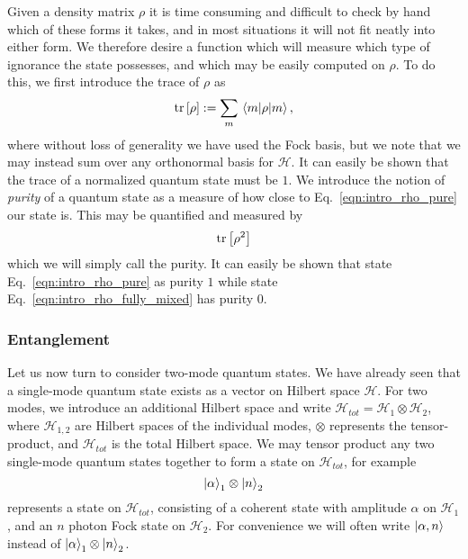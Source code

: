 Given a density matrix $\rho$ it is time consuming and difficult to check by hand which of these forms it takes, and in most situations it will not fit neatly into either form. We therefore desire a function which will measure which type of ignorance the state possesses, and which may be easily computed on $\rho$. To do this, we first introduce the trace of $\rho$ as
\begin{equation}
\tr\left[\rho\right] := \sum_m \mel{m}{\rho}{m},
\end{equation}
where without loss of generality we have used the Fock basis, but we note that we may instead sum over any orthonormal basis for $\mathcal{H}$. It can easily be shown that the trace of a normalized quantum state must be $1$. We introduce the notion of \emph{purity} of a quantum state as a measure of how close to Eq.~\ref{eqn:intro_rho_pure} our state is. This may be quantified and measured by
\begin{equation}\label{eqn:intro_purity}
\tr\left[ \rho^2 \right]
\end{equation}
which we will simply call the purity. It can easily be shown that state Eq.~\ref{eqn:intro_rho_pure} as purity $1$ while state Eq.~\ref{eqn:intro_rho_fully_mixed} has purity $0$.

\subsubsection{Entanglement}

Let us now turn to consider two-mode quantum states. We have already seen that a single-mode quantum state exists as a vector on Hilbert space $\mathcal{H}$. For two modes, we introduce an additional Hilbert space and write $\mathcal{H}_{tot} = \mathcal{H}_1 \otimes \mathcal{H}_2$, where $\mathcal{H}_{1,2}$ are Hilbert spaces of the individual modes, $\otimes$ represents the tensor-product, and $\mathcal{H}_{tot}$ is the total Hilbert space. We may tensor product any two single-mode quantum states together to form a state on $\mathcal{H}_{tot}$, for example
\begin{equation}\label{eqn:intro_separable_1}
\ket{\alpha}_1 \otimes \ket{n}_2
\end{equation}
represents a state on $\mathcal{H}_{tot}$, consisting of a coherent state with amplitude $\alpha$ on $\mathcal{H}_1$, and an $n$ photon Fock state on $\mathcal{H}_2$. For convenience we will often write $\ket{\alpha, n}$ instead of $\ket{\alpha}_1 \otimes \ket{n}_2$.

